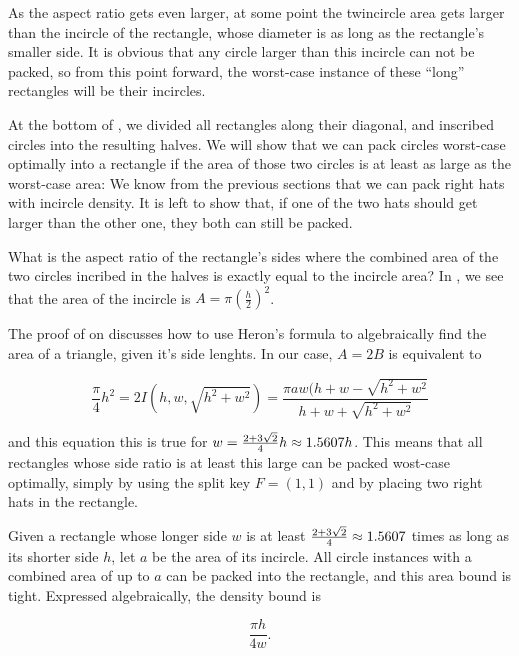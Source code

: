 \documentclass[a4paper,style=print,oneside,bibliography=totoc,nexus,lnum,extramargin]{tubsbook}
\begin{document}
As the aspect ratio gets even larger, at some point the twincircle area gets larger than the incircle of the rectangle, whose diameter is as long as the rectangle's smaller side. It is obvious that any circle larger than this incircle can not be packed, so from this point forward, the worst-case instance of these “long” rectangles will be their incircles.


At the bottom of , we divided all rectangles along their diagonal, and inscribed circles into the resulting halves. We will show that we can pack circles worst-case optimally into a rectangle if the area of those two circles is at least as large as the worst-case area:
We know from the previous sections that we can pack right hats with incircle density. It is left to show that, if one of the two hats should get larger than the other one, they both can still be packed.

What is the aspect ratio of the rectangle's sides where the combined area of the two circles incribed in the halves is exactly equal to the incircle area? In , we see that the area of the incircle is $A = \pi(\frac{h}{2})^2$.


The proof of  on  discusses how to use Heron's formula to algebraically find the area of a triangle, given it's side lenghts.
In our case, $A = 2B$ is equivalent to

$$\frac{\pi}{4}h^2 = 2I(h,w,\sqrt{h^2+w^2}) = \frac{\pi aw(h+w-\sqrt{h^2+w^2}}{h+w+\sqrt{h^2+w^2}}$$

and this equation this is true for $w = \frac{2+3\sqrt{2}}{4}h \approx 1.5607h$.
This means that all rectangles whose side ratio is at least this large can be packed wost-case optimally, simply by using the split key $F = (1,1)$ and by placing two right hats in the rectangle.

\begin{theorem}\label{th:rect}
    Given a rectangle whose longer side $w$ is at least $\frac{2+3\sqrt{2}}{4} \approx 1.5607$ times as long as its shorter side $h$, let $a$ be the area of its incircle.
    All circle instances with a combined area of up to $a$ can be packed into the rectangle, and this area bound is tight. Expressed algebraically, the density bound is

    $$\frac{\pi h}{4w}.$$

\end{theorem}
\end{document}
